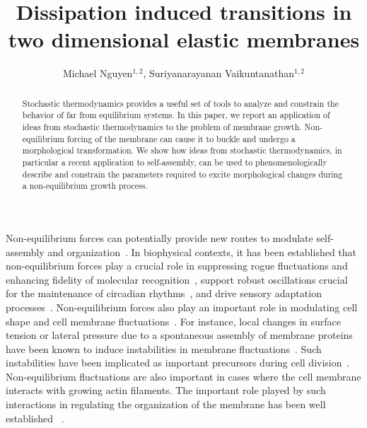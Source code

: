\documentclass[amsmath,preprintnumbers,10pt,nofootinbib,prl,twocolumn]{revtex4-1}
\begin{document}
\title{Dissipation induced transitions in two dimensional elastic membranes}
\author{Michael Nguyen$^{1,2}$, Suriyanarayanan Vaikuntanathan$^{1,2}$} 
\begin{abstract}
Stochastic thermodynamics provides a useful set of tools to analyze and constrain the behavior of far from equilibrium systems. In this paper, we report an application of ideas from stochastic thermodynamics to the problem of membrane growth. Non-equilibrium forcing of the membrane can cause it to buckle and undergo a morphological transformation. We show how ideas from stochastic thermodynamics, in particular a recent application to self-assembly, can be used to phenomenologically describe and constrain the parameters required to excite morphological changes during a non-equilibrium growth process.

\end{abstract}
\maketitle 
Non-equilibrium forces can potentially provide new routes to modulate self-assembly and organization~\cite{Battle604,Lan2012,Mehta2012,Whitelam2014}. In biophysical contexts, it has been established that non-equilibrium forces play a crucial role in suppressing rogue fluctuations and enhancing fidelity of molecular recognition~\cite{Hopfield1974,Mehta2012,Murugan2012,Murugan2016,Vaikunt2017}, support robust oscillations crucial for the maintenance of circadian rhythms~\cite{Barato2015}, and drive sensory adaptation processes~\cite{Lan2012,Mehta2012}. Non-equilibrium forces also play an important role in modulating cell shape and cell membrane fluctuations~\cite{McMahon2005, Turlier2016}. For instance, local changes in surface tension or lateral pressure due to a spontaneous assembly of membrane proteins have been known to induce instabilities in membrane fluctuations~\cite{Stachowiak2012, Chen2016,Rangamani2014,Leibler1986}. Such instabilities have been implicated as important precursors during cell division~\cite{McMahon2005}. Non-equilibrium fluctuations are also important in cases where the cell membrane interacts with growing actin filaments. The important role played by such interactions in regulating the organization of the membrane has been well established ~\cite{Gowrishankar2012,Weichsel2016}.
\end{document}
